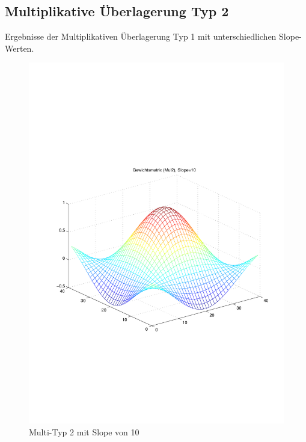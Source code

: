 \newpage
\subsection{Multiplikative Überlagerung Typ 2}
Ergebnisse der Multiplikativen Überlagerung Typ 1 mit unterschiedlichen Slope-Werten.
\begin{figure}[hbt]
	\begin{minipage}{0.48\textwidth}
		\includegraphics[trim=70 200 32 242, clip, width=\textwidth]{./Bilder/Auswertung/Gewichtsmatrix/Gewichtsmatrix_Mul2_Slope_10}
		\caption{Multi-Typ 2 mit Slope von 10}
		\label{Mul210}
	\end{minipage}
	\hfill
	\begin{minipage}{0.48\textwidth}

\end{minipage}
\end{figure}

